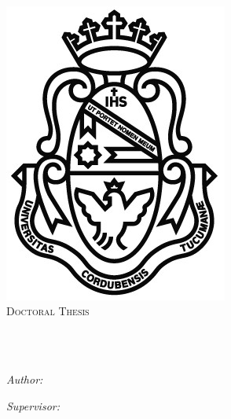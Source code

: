 \documentclass[
11pt, %
english, %
onehalfspacing, %
nolistspacing, %
headsepline, %
consistentlayout, %
]{MastersDoctoralThesis} %
\author{Cristian \textsc{Cardellino}} %
\begin{document}
\frontmatter %

\pagestyle{plain} %


\begin{titlepage}
\begin{center}

{\scshape\LARGE \univname\\\facname\par}\vspace{0.5cm} %
\includegraphics[scale=0.4]{images/logounc.jpg}\\[0.4cm] %
\textsc{\Large Doctoral Thesis}\\[0.2cm] %

\HRule \\[0.4cm] %
{\huge \bfseries \ttitle\par}\vspace{0.4cm} %
\HRule \\[1cm] %
 
\begin{minipage}[t]{0.4\textwidth}
\begin{flushleft} \large
\emph{Author:}\\
\href{https://crscardellino.github.io}{\authorname} %
\end{flushleft}
\end{minipage}
\begin{minipage}[t]{0.4\textwidth}
\begin{flushright} \large
\emph{Supervisor:} \\
\href{https://cs.famaf.unc.edu.ar/~laura/}{\supname} %
\end{flushright}
\end{minipage}\\[1cm]


\end{center}
\end{titlepage}
\end{document}
